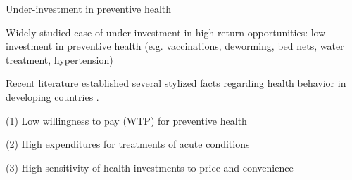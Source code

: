 \documentclass[aspectratio=169, 10pt, handout]{beamer}
\newenvironment{wideitemize}{\itemize\addtolength{\itemsep}{10pt}}{\enditemize}
\begin{document}
\begin{frame}{Under-investment in preventive health}

\begin{wideitemize}

	\item Widely studied case of under-investment in high-return opportunities: low investment in preventive health (e.g. vaccinations, deworming, bed nets, water treatment, hypertension)
	
		
	\item Recent literature established several stylized facts regarding health behavior in developing countries \citep{dupas2011health,kremer2011improving,dupas2017impacts}.
	
	\begin{wideitemize}
	
	\smallskip
	
		\item[(1)] Low willingness to pay (WTP) for preventive health
		
		\item[(2)] High expenditures for treatments of acute conditions
		
		\item[(3)] High sensitivity of health investments to price and convenience
	
	\end{wideitemize}


\end{wideitemize}


\end{frame}
\end{document}
